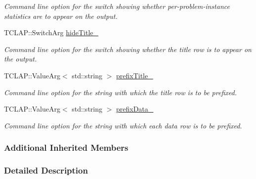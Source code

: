 \begin{DoxyCompactItemize}
\begin{DoxyCompactList}\small\item\em Command line option for the switch showing whether per-\/problem-\/instance statistics are to appear on the output. \end{DoxyCompactList}\item 
T\+C\+L\+A\+P\+::\+Switch\+Arg \hyperlink{structcommandLine_1_1CommandLine_a384554d79415a4a93e8ccd55967cebaf}{hide\+Title\+\_\+}\hypertarget{structcommandLine_1_1CommandLine_a384554d79415a4a93e8ccd55967cebaf}{}\label{structcommandLine_1_1CommandLine_a384554d79415a4a93e8ccd55967cebaf}

\begin{DoxyCompactList}\small\item\em Command line option for the switch showing whether the title row is to appear on the output. \end{DoxyCompactList}\item 
T\+C\+L\+A\+P\+::\+Value\+Arg$<$ std\+::string $>$ \hyperlink{structcommandLine_1_1CommandLine_a317fbe0249a866e00f7d5c3058925ea7}{prefix\+Title\+\_\+}\hypertarget{structcommandLine_1_1CommandLine_a317fbe0249a866e00f7d5c3058925ea7}{}\label{structcommandLine_1_1CommandLine_a317fbe0249a866e00f7d5c3058925ea7}

\begin{DoxyCompactList}\small\item\em Command line option for the string with which the title row is to be prefixed. \end{DoxyCompactList}\item 
T\+C\+L\+A\+P\+::\+Value\+Arg$<$ std\+::string $>$ \hyperlink{structcommandLine_1_1CommandLine_a2f8f6b2d07aba9eb3f3d2407a474869d}{prefix\+Data\+\_\+}\hypertarget{structcommandLine_1_1CommandLine_a2f8f6b2d07aba9eb3f3d2407a474869d}{}\label{structcommandLine_1_1CommandLine_a2f8f6b2d07aba9eb3f3d2407a474869d}

\begin{DoxyCompactList}\small\item\em Command line option for the string with which each data row is to be prefixed. \end{DoxyCompactList}\end{DoxyCompactItemize}
\subsubsection*{Additional Inherited Members}


\subsubsection{Detailed Description}
